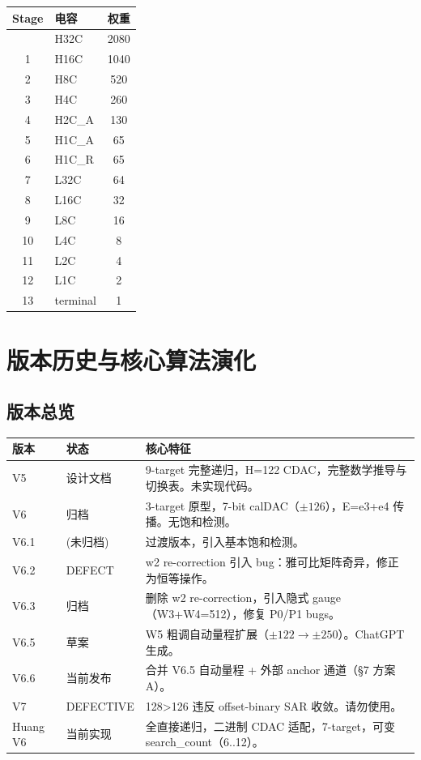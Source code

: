 \documentclass[UTF8,a4paper,12pt]{ctexart}
\theoremstyle{definition}
\begin{document}
\begin{longtable}{clc}
\toprule
\textbf{Stage} & \textbf{电容} & \textbf{权重} \\
\midrule
\endhead
\bottomrule
\endfoot
0 & H32C & 2080 \\
1 & H16C & 1040 \\
2 & H8C & 520 \\
3 & H4C & 260 \\
4 & H2C\_A & 130 \\
5 & H1C\_A & 65 \\
6 & H1C\_R & 65 \\
7 & L32C & 64 \\
8 & L16C & 32 \\
9 & L8C & 16 \\
10 & L4C & 8 \\
11 & L2C & 4 \\
12 & L1C & 2 \\
13 & terminal & 1 \\
\bottomrule
\end{longtable}

\section{版本历史与核心算法演化}

\subsection{版本总览}

\begin{longtable}{p{2cm}p{3cm}p{9cm}}
\toprule
\textbf{版本} & \textbf{状态} & \textbf{核心特征} \\
\midrule
\endhead
\bottomrule
\endfoot
V5 & 设计文档 & 9-target 完整递归，H=122 CDAC，完整数学推导与切换表。未实现代码。 \\
V6 & 归档 & 3-target 原型，7-bit calDAC（$\pm 126$），E=e3+e4 传播。无饱和检测。 \\
V6.1 & (未归档) & 过渡版本，引入基本饱和检测。 \\
V6.2 & DEFECT & w2 re-correction 引入 bug：雅可比矩阵奇异，修正为恒等操作。 \\
V6.3 & 归档 & 删除 w2 re-correction，引入隐式 gauge（W3+W4=512），修复 P0/P1 bugs。 \\
V6.5 & 草案 & W5 粗调自动量程扩展（$\pm 122 \to \pm 250$）。ChatGPT 生成。 \\
V6.6 & 当前发布 & 合并 V6.5 自动量程 + 外部 anchor 通道（§7 方案 A）。 \\
V7 & DEFECTIVE & 128>126 违反 offset-binary SAR 收敛。请勿使用。 \\
Huang V6 & 当前实现 & 全直接递归，二进制 CDAC 适配，7-target，可变 search\_count（6..12）。 \\
\bottomrule
\end{longtable}
\end{document}

